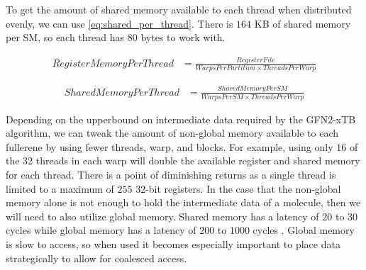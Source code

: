 To get the amount of shared memory available to each thread when distributed evenly, we can use \autoref{eq:shared_per_thread}. There is $164$ KB of shared memory per SM, so each thread has $80$ bytes to work with.

\begin{equation}
\begin{split}
        RegisterMemoryPerThread &= \frac{RegisterFile}{WarpsPerPartition \times ThreadsPerWarp} \label{eq:reg_per_thread}
\end{split}
\end{equation}

\begin{equation}
\begin{split}
        SharedMemoryPerThread &= \frac{SharedMemoryPerSM}{WarpsPerSM \times ThreadsPerWarp} \label{eq:shared_per_thread}
\end{split}
\end{equation}


Depending on the upperbound on intermediate data required by the GFN2-xTB algorithm, we can tweak the amount of non-global memory available to each fullerene by using fewer threads, warp, and blocks. For example, using only $16$ of the $32$ threads in each warp will double the available register and shared memory for each thread. There is a point of diminishing returns as a single thread is limited to a maximum of $255$ $32$-bit registers. In the case that the non-global memory alone is not enough to hold the intermediate data of a molecule, then we will need to also utilize global memory. Shared memory has a latency of $20$ to $30$ cycles while global memory has a latency of $200$ to $1000$ cycles \cite{nasa-nvidia-basics}. Global memory is slow to access, so when used it becomes especially important to place data strategically to allow for coalesced access.

